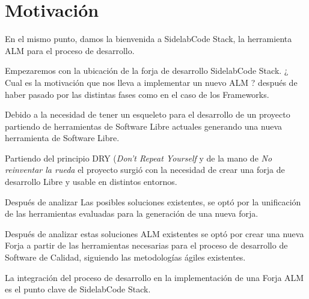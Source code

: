 \documentclass[11pt]{scrartcl}
\begin{document}
\tableofcontents  %

\newpage









\section{Motivaci\'on}
\label{sec:motivacion}

\par En el mismo punto, damos la bienvenida a SidelabCode Stack, la herramienta ALM para el proceso de desarrollo. 

\par Empezaremos con la ubicación de la forja de desarrollo SidelabCode Stack. ¿ Cual es la motivación que nos lleva a implementar un nuevo ALM ? después de haber pasado por las distintas fases como en el caso de los Frameworks.

\par Debido a la necesidad de tener un esqueleto para el desarrollo de un proyecto partiendo de herramientas de Software Libre actuales generando una nueva herramienta de Software Libre.

\par Partiendo del principio DRY (\emph{Don't Repeat Yourself} y de la mano de \emph{No reinventar la rueda} el proyecto surgió con la necesidad de crear una forja de desarrollo Libre y usable en distintos entornos.

\par Después de analizar Las posibles soluciones existentes, se optó por la unificación de las herramientas evaluadas para la generación de una nueva forja. 

\par Después de analizar estas soluciones ALM existentes se optó por crear una nueva Forja a partir de las herramientas necesarias para el proceso de desarrollo de Software de Calidad, siguiendo las metodologías ágiles existentes.

\par La integración del proceso de desarrollo en la implementación de una Forja ALM es el punto clave de SidelabCode Stack.
\end{document}
